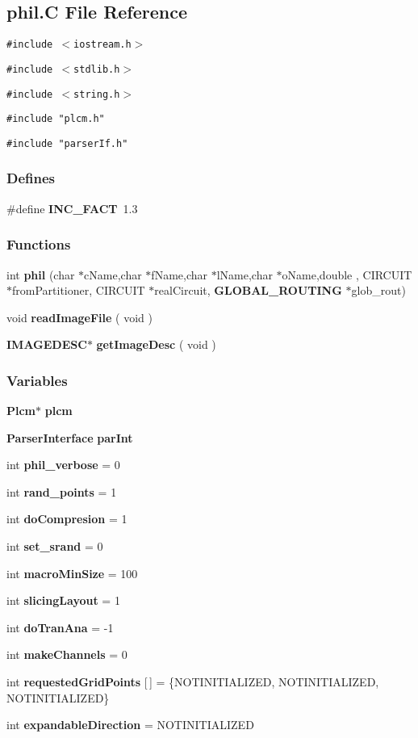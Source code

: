 \subsection{phil.C File Reference}
\label{phil.C}
{\tt \#include $<$iostream.h$>$}\par
{\tt \#include $<$stdlib.h$>$}\par
{\tt \#include $<$string.h$>$}\par
{\tt \#include "plcm.h"}\par
{\tt \#include "parser\-If.h"}\par
\subsubsection*{Defines}
\begin{CompactItemize}
\item 
\#define {\bf INC\_\-FACT}\ 1.3
\end{CompactItemize}
\subsubsection*{Functions}
\begin{CompactItemize}
\item 
int {\bf phil} (char $\ast$c\-Name,char $\ast$f\-Name,char $\ast$l\-Name,char $\ast$o\-Name,double , CIRCUIT $\ast$from\-Partitioner, CIRCUIT $\ast$real\-Circuit, {\bf GLOBAL\_\-ROUTING} $\ast$glob\_\-rout)
\item 
void {\bf read\-Image\-File} ( void )
\item 
{\bf IMAGEDESC}$\ast$ {\bf get\-Image\-Desc} ( void )
\end{CompactItemize}
\subsubsection*{Variables}
\begin{CompactItemize}
\item 
{\bf Plcm}$\ast$ {\bf plcm}
\item 
{\bf Parser\-Interface} {\bf par\-Int}
\item 
int {\bf phil\_\-verbose} = 0
\item 
int {\bf rand\_\-points} = 1
\item 
int {\bf do\-Compresion} = 1
\item 
int {\bf set\_\-srand} = 0
\item 
int {\bf macro\-Min\-Size} = 100
\item 
int {\bf slicing\-Layout} = 1
\item 
int {\bf do\-Tran\-Ana} = -1
\item 
int {\bf make\-Channels} = 0
\item 
int {\bf requested\-Grid\-Points} [$\,$] = \{NOTINITIALIZED, NOTINITIALIZED, NOTINITIALIZED\}
\item 
int {\bf expandable\-Direction} = NOTINITIALIZED
\end{CompactItemize}


